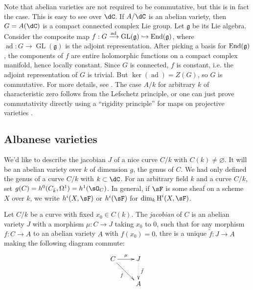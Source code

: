 \documentclass{article}
\begin{document}
Note that abelian varieties are not required to be commutative, but this is in 
fact the case. This is easy to see over $\dC$. If $A/\dC$ is an 
abelian variety, then $G=A(\dC)$ is a compact connected complex Lie 
group. Let $\mathfrak{g}$ be its Lie algebra. Consider the composite map 
$f:G\xrightarrow{\text{ad}}\operatorname{GL}(\mathfrak{g}) \hookrightarrow 
\operatorname{End}(\mathfrak{g})$, where 
$\operatorname{ad}:G\to\operatorname{GL}(\mathfrak{g})$ is the adjoint 
representation. After picking a basis for $\operatorname{End}(\mathfrak{g})$, 
the components of $f$ are entire holomorphic functions on a compact complex 
manifold, hence locally constant. Since $G$ is connected, $f$ is constant, i.e. 
the adjoint representation of $G$ is trivial. But 
$\ker(\operatorname{ad}) = Z(G)$, so $G$ is commutative. For more details, see 
\cite[I.1]{mu08}. The case $A/k$ for arbitrary $k$ of characteristic zero 
follows from the Lefschetz principle, or one can just prove commutativity 
directly using a ``rigidity principle'' for maps on projective varieties
\cite[I.1.4]{mi}. 





\subsection*{Albanese varieties}

We'd like to describe the jacobian $J$ of a nice curve $C/k$ with 
$C(k)\ne\varnothing$. It will be an abelian variety over $k$ of dimension 
$g$, the genus of $C$. We had only defined the genus of a curve $C/k$ with 
$k\subset \dC$. For an arbitrary field $k$ and a curve $C/k$, set 
$g(C)=h^0(C_{\bar k},\Omega^1) = h^1(\sO_C)$. In general, if $\sF$ is some 
sheaf on a scheme $X$ over $k$, we write $h^i(X,\sF)$ or $h^i(\sF)$ for 
$\dim_k \h^i(X,\sF)$.

\begin{definition}[Albanese]
Let $C/k$ be a curve with fixed $x_0\in C(k)$. The \emph{jacobian} of $C$ is 
an abelian variety $J$ with a morphism $\mu:C\to J$ taking $x_0$ to $0$, such 
that for any morphism $f:C\to A$ to an abelian variety $A$ with $f(x_0)=0$, 
thre is a unique $\tilde f:J\to A$ making the following diagram commute:
\[\xymatrix{
  C \ar[r]^-\mu \ar[dr]_-f 
    & J \ar@{.>}[d]^-{\tilde f} \\
  & A
}\]
\end{definition}
\end{document}
